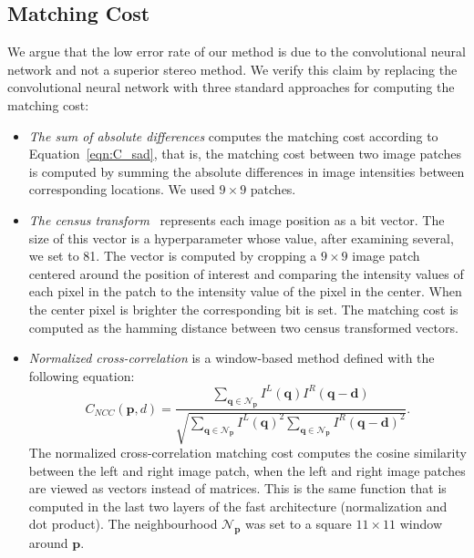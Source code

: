 \documentclass[twoside,11pt]{article}
\begin{document}
\subsection{Matching Cost}

We argue that the low error rate of our method is due to the convolutional
neural network and not a superior stereo method. We verify this claim by
replacing the convolutional neural network with three standard approaches for
computing the matching cost:

\begin{itemize}

\item \emph{The sum of absolute differences} computes the matching
cost according to Equation~\eqref{eqn:C_sad}, that is, the matching cost
between two image patches is computed by summing the absolute differences in
image intensities between corresponding locations. We used \(9 \times 9\)
patches.

\item \emph{The census transform}~\citep{zabih1994non} represents each image
position as a bit vector. The size of this vector is a hyperparameter whose
value, after examining several, we set to 81. The vector is computed
by cropping a \(9 \times 9 \) image patch centered around the position of
interest and comparing the intensity values of each pixel in the patch to the
intensity value of the pixel in the center. When the center pixel is brighter
the corresponding bit is set. The matching cost is computed as the hamming
distance between two census transformed vectors. 

\item \emph{Normalized cross-correlation} is a window-based method defined
with the following equation:
%
\begin{equation*}
C_{NCC}(\mathbf{p}, d) = \frac{\sum_{\mathbf{q} \in \mathcal{N}_{\mathbf{p}}} I^L(\mathbf{q}) I^R(\mathbf{q} - \mathbf{d})}
{\sqrt{\sum_{\mathbf{q} \in \mathcal{N}_{\mathbf{p}}} I^L(\mathbf{q})^2 \sum_{\mathbf{q} \in \mathcal{N}_{\mathbf{p}}} I^R(\mathbf{q} - \mathbf{d})^2 }}.
\end{equation*}
%
The normalized cross-correlation matching cost computes the cosine similarity
between the left and right image patch, when the left and right image patches
are viewed as vectors instead of matrices. This is the same function that
is computed in the last two layers of the fast architecture (normalization and
dot product).  The neighbourhood $\mathcal{N}_{\mathbf{p}}$ was set to a square
$11 \times 11$ window around $\mathbf{p}$.


\end{itemize}
\end{document}
